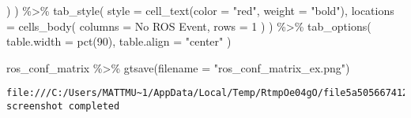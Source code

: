 \documentclass[
  10pt,
  letterpaper,
  DIV=11,
  numbers=noendperiod]{scrartcl}
\newenvironment{Shaded}{\begin{snugshade}}{\end{snugshade}}
\newcommand{\AttributeTok}[1]{\textcolor[rgb]{0.40,0.45,0.13}{#1}}
\newcommand{\DecValTok}[1]{\textcolor[rgb]{0.68,0.00,0.00}{#1}}
\newcommand{\FunctionTok}[1]{\textcolor[rgb]{0.28,0.35,0.67}{#1}}
\newcommand{\NormalTok}[1]{\textcolor[rgb]{0.00,0.23,0.31}{#1}}
\newcommand{\SpecialCharTok}[1]{\textcolor[rgb]{0.37,0.37,0.37}{#1}}
\newcommand{\StringTok}[1]{\textcolor[rgb]{0.13,0.47,0.30}{#1}}
\begin{document}
\begin{Shaded}
\begin{Highlighting}[]
\NormalTok{    )}
\NormalTok{  ) }\SpecialCharTok{\%\textgreater{}\%}
  \FunctionTok{tab\_style}\NormalTok{(}
    \AttributeTok{style =} \FunctionTok{cell\_text}\NormalTok{(}\AttributeTok{color =} \StringTok{"red"}\NormalTok{, }\AttributeTok{weight =} \StringTok{"bold"}\NormalTok{),}
    \AttributeTok{locations =} \FunctionTok{cells\_body}\NormalTok{(}
      \AttributeTok{columns =} \StringTok{\textasciigrave{}}\AttributeTok{No ROS Event}\StringTok{\textasciigrave{}}\NormalTok{, }\AttributeTok{rows =} \DecValTok{1}
\NormalTok{    )}
\NormalTok{  ) }\SpecialCharTok{\%\textgreater{}\%}
  \FunctionTok{tab\_options}\NormalTok{(}
    \AttributeTok{table.width =} \FunctionTok{pct}\NormalTok{(}\DecValTok{90}\NormalTok{),}
    \AttributeTok{table.align =} \StringTok{"center"}
\NormalTok{  )}
\end{Highlighting}
\end{Shaded}

\begin{Shaded}
\begin{Highlighting}[]
\NormalTok{ros\_conf\_matrix }\SpecialCharTok{\%\textgreater{}\%}  \FunctionTok{gtsave}\NormalTok{(}\AttributeTok{filename =} \StringTok{"ros\_conf\_matrix\_ex.png"}\NormalTok{)}
\end{Highlighting}
\end{Shaded}

\begin{verbatim}
file:///C:/Users/MATTMU~1/AppData/Local/Temp/RtmpOe04gO/file5a505667412b.html screenshot completed
\end{verbatim}
\end{document}
